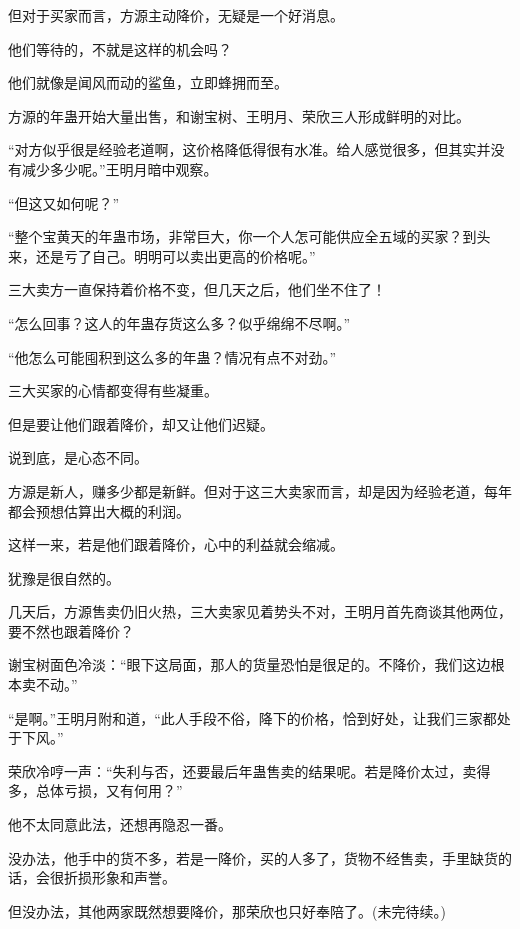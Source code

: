 \begin{this_body}
但对于买家而言，方源主动降价，无疑是一个好消息。

他们等待的，不就是这样的机会吗？

他们就像是闻风而动的鲨鱼，立即蜂拥而至。

方源的年蛊开始大量出售，和谢宝树、王明月、荣欣三人形成鲜明的对比。

“对方似乎很是经验老道啊，这价格降低得很有水准。给人感觉很多，但其实并没有减少多少呢。”王明月暗中观察。

“但这又如何呢？”

“整个宝黄天的年蛊市场，非常巨大，你一个人怎可能供应全五域的买家？到头来，还是亏了自己。明明可以卖出更高的价格呢。”

三大卖方一直保持着价格不变，但几天之后，他们坐不住了！

“怎么回事？这人的年蛊存货这么多？似乎绵绵不尽啊。”

“他怎么可能囤积到这么多的年蛊？情况有点不对劲。”

三大买家的心情都变得有些凝重。

但是要让他们跟着降价，却又让他们迟疑。

说到底，是心态不同。

方源是新人，赚多少都是新鲜。但对于这三大卖家而言，却是因为经验老道，每年都会预想估算出大概的利润。

这样一来，若是他们跟着降价，心中的利益就会缩减。

犹豫是很自然的。

几天后，方源售卖仍旧火热，三大卖家见着势头不对，王明月首先商谈其他两位，要不然也跟着降价？

谢宝树面色冷淡：“眼下这局面，那人的货量恐怕是很足的。不降价，我们这边根本卖不动。”

“是啊。”王明月附和道，“此人手段不俗，降下的价格，恰到好处，让我们三家都处于下风。”

荣欣冷哼一声：“失利与否，还要最后年蛊售卖的结果呢。若是降价太过，卖得多，总体亏损，又有何用？”

他不太同意此法，还想再隐忍一番。

没办法，他手中的货不多，若是一降价，买的人多了，货物不经售卖，手里缺货的话，会很折损形象和声誉。

但没办法，其他两家既然想要降价，那荣欣也只好奉陪了。(未完待续。)

\end{this_body}

